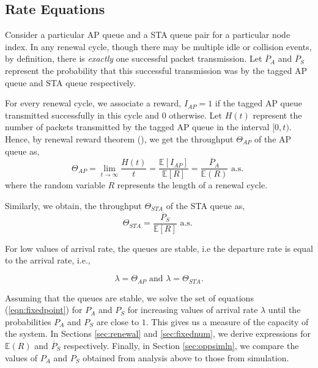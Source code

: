 \documentclass[10pt,conference]{IEEEtran}
\newcommand{\peqnap}{\overline{P}_{A}}
\newcommand{\peqnsta}{\overline{P}_{S}}
\newcommand{\pap}{P_A}
\newcommand{\psta}{P_S}
\newcommand{\renew}{{R}}
\begin{document}
\subsection{Rate Equations}
\label{sec:fixedpoint}

Consider a particular AP queue and a STA queue pair for a particular node index. In any renewal cycle, though there may be multiple idle or collision events, by definition, there is \emph{exactly} one successful packet transmission. 
Let $\peqnap$ and $\peqnsta$ represent the probability that this successful transmission was by the tagged AP queue and STA queue respectively.

For every renewal cycle, we associate a reward, $I_{AP}=1$ if the tagged AP queue transmitted successfully in this cycle and  $0$ otherwise. Let $H(t)$ represent the number of packets transmitted by the tagged AP queue
 in the interval $[0,t)$. Hence, by renewal reward theorem (\cite{wolf89}), we get the throughput $\Theta_{AP}$ of the AP queue as,
\begin{equation}
 \Theta_{AP}=\lim_{t\to\infty} \frac{H(t)}{t} = \frac{\mathbb{E}[I_{AP}]}{\mathbb{E}[\renew]} = \frac{\peqnap}{\mathbb{E}(\renew)}\text{ a.s. }
\end{equation}
where the random variable $\renew$ represents the length of a renewal cycle.

Similarly, we obtain, the throughput $\Theta_{STA}$ of the STA queue as,
 \begin{equation}
 \Theta_{STA} = \frac{\peqnsta}{\mathbb{E}[\renew]} \text{ a.s. }
\end{equation}
 
  For low values of arrival rate, the queues are stable, i.e the departure rate is equal to the arrival rate, i.e.,

\begin{equation}
 \lambda = \Theta_{AP}\text{      and     }\lambda = \Theta_{STA}. 
 \label{eqn:fixedpoint}
\end{equation}


Assuming that the queues are stable, we solve the set of equations (\ref{eqn:fixedpoint}) for $\pap$ and $\psta$ for increasing values of arrival rate $\lambda$ until the probabilities $\pap$ and $\psta$  are close to $1$. 
This gives us a measure of the capacity of the system. 
In Sections \ref{sec:renewal} and \ref{sec:fixednum}, we derive expressions for $\mathbb{E}(\renew)$ and $\peqnsta$ respectively.
Finally, in Section \ref{sec:oppsimln}, we compare the values of $\pap$ and $\psta$ obtained from analysis above to those from simulation.
\end{document}
